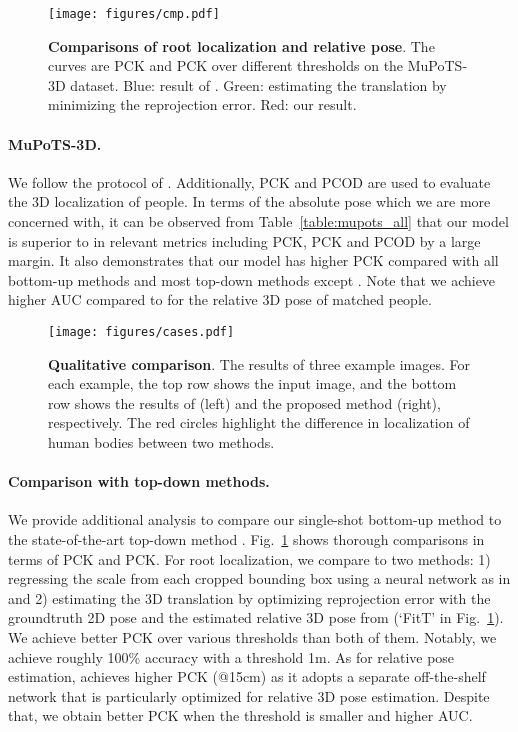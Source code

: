 \documentclass[runningheads]{llncs}
\begin{document}
\begin{figure}[t!]
	\centering
	\texttt{[image: figures/cmp.pdf]}
 	\caption{
 		\textbf{Comparisons of root localization and relative pose}. The curves are PCK and PCK over different thresholds on the MuPoTS-3D dataset. Blue: result of \cite{Moon_2019_ICCV_3DMPPE}. Green: estimating the translation by minimizing the reprojection error. Red: our result.
 	}
 	\label{fig:rootrelPCK}
 \end{figure}

\paragraph{\bf MuPoTS-3D.} 
We follow the protocol of \cite{Moon_2019_ICCV_3DMPPE}. Additionally, PCK and PCOD are used to evaluate the 3D localization of people. In terms of the absolute pose which we are more concerned with, it can be observed from Table~\ref{table:mupots_all} that our model is superior to \cite{Moon_2019_ICCV_3DMPPE} in relevant metrics including PCK, PCK and PCOD by a large margin. It also demonstrates that our model has higher PCK compared with all bottom-up methods and most top-down methods except \cite{Moon_2019_ICCV_3DMPPE}. Note that we achieve higher AUC compared to \cite{Moon_2019_ICCV_3DMPPE} for the relative 3D pose of matched people.

\begin{figure*}[t!]
	\centering
	\texttt{[image: figures/cases.pdf]}
 	\caption{
		\textbf{Qualitative comparison}. The results of three example images. For each example, the top row shows the input image, and the bottom row shows the results of \cite{Moon_2019_ICCV_3DMPPE} (left) and the proposed method (right), respectively. The red circles highlight the difference in localization of human bodies between two methods.
 	}
 	\label{fig:case}
 \end{figure*}

\paragraph{\bf Comparison with top-down methods.} 
We provide additional analysis to compare our single-shot bottom-up method to the state-of-the-art top-down method \cite{Moon_2019_ICCV_3DMPPE}. Fig.~\ref{fig:rootrelPCK} shows thorough comparisons in terms of PCK and PCK. For root localization, we compare to two methods: 1) regressing the scale from each cropped bounding box using a neural network as in \cite{Moon_2019_ICCV_3DMPPE} and 2) estimating the 3D translation by optimizing reprojection error with the groundtruth 2D pose and the estimated relative 3D pose from \cite{Moon_2019_ICCV_3DMPPE} (`FitT' in Fig.~\ref{fig:rootrelPCK}). We achieve better PCK over various thresholds than both of them. Notably, we achieve roughly 100\% accuracy with a threshold 1m. As for relative pose estimation, \cite{Moon_2019_ICCV_3DMPPE} achieves higher PCK (@15cm) as it adopts a separate off-the-shelf network \cite{sun2018integral} that is particularly optimized for relative 3D pose estimation. Despite that, we obtain better PCK when the threshold is smaller and higher AUC. 
\end{document}
